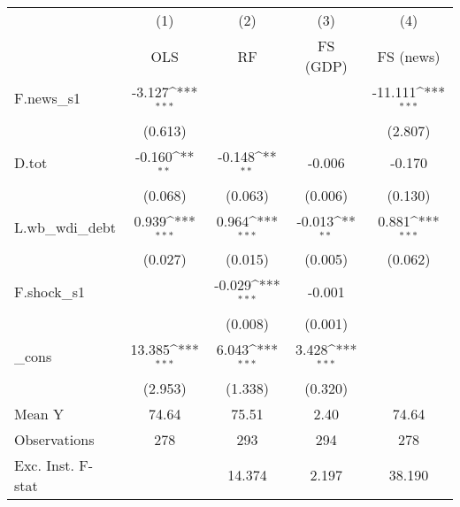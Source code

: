 {
\def\sym#1{\ifmmode^{#1}\else\(^{#1}\)\fi}
\begin{tabular}{l*{4}{c}}
\toprule
            &\multicolumn{1}{c}{(1)}&\multicolumn{1}{c}{(2)}&\multicolumn{1}{c}{(3)}&\multicolumn{1}{c}{(4)}\\
            &\multicolumn{1}{c}{OLS}&\multicolumn{1}{c}{RF}&\multicolumn{1}{c}{FS (GDP)}&\multicolumn{1}{c}{FS (news)}\\
\midrule
F.news\_s1   &      -3.127\sym{***}&                     &                     &     -11.111\sym{***}\\
            &     (0.613)         &                     &                     &     (2.807)         \\
\addlinespace
D.tot       &      -0.160\sym{**} &      -0.148\sym{**} &      -0.006         &      -0.170         \\
            &     (0.068)         &     (0.063)         &     (0.006)         &     (0.130)         \\
\addlinespace
L.wb\_wdi\_debt&       0.939\sym{***}&       0.964\sym{***}&      -0.013\sym{**} &       0.881\sym{***}\\
            &     (0.027)         &     (0.015)         &     (0.005)         &     (0.062)         \\
\addlinespace
F.shock\_s1  &                     &      -0.029\sym{***}&      -0.001         &                     \\
            &                     &     (0.008)         &     (0.001)         &                     \\
\addlinespace
\_cons      &      13.385\sym{***}&       6.043\sym{***}&       3.428\sym{***}&                     \\
            &     (2.953)         &     (1.338)         &     (0.320)         &                     \\
\midrule
Mean Y      &       74.64         &       75.51         &        2.40         &       74.64         \\
Observations&         278         &         293         &         294         &         278         \\
Exc. Inst. F-stat&                     &      14.374         &       2.197         &      38.190         \\
\bottomrule
\end{tabular}
}
